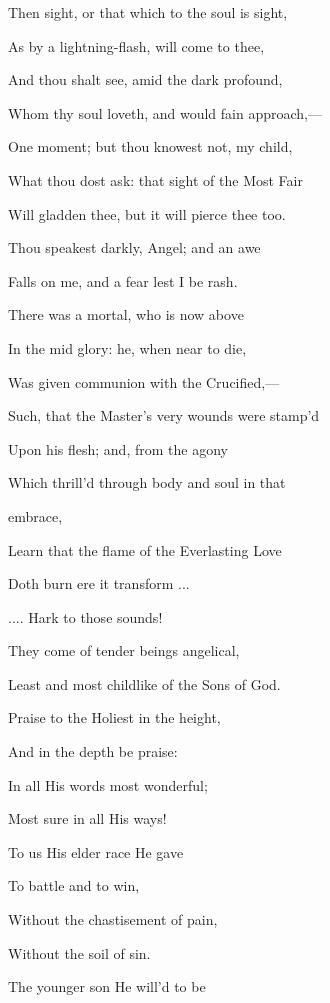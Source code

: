 Then sight, or that which to the soul is sight,

As by a lightning-flash, will come to thee,

And thou shalt see, amid the dark profound,

Whom thy soul loveth, and would fain approach,—

One moment; but thou knowest not, my child,

What thou dost ask: that sight of the Most Fair

Will gladden thee, but it will pierce thee too.


Thou speakest darkly, Angel; and an awe

Falls on me, and a fear lest I be rash.


There was a mortal, who is now above

In the mid glory: he, when near to die,

Was given communion with the Crucified,—

Such, that the Master's very wounds were stamp'd

Upon his flesh; and, from the agony

Which thrill'd through body and soul in that

embrace,

Learn that the flame of the Everlasting Love

Doth burn ere it transform ...


.... Hark to those sounds!

They come of tender beings angelical,

Least and most childlike of the Sons of God.


Praise to
the Holiest in the height,

And in the depth be praise:

In all
His words most wonderful;

Most sure in all His ways!

To us His
elder race He gave

To battle and to win,

Without
the chastisement of pain,

Without the soil of sin.

The
younger son He will'd to be


